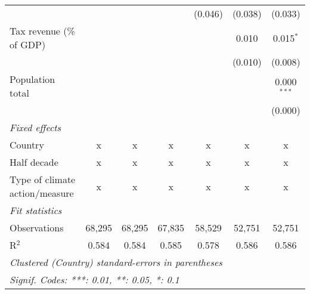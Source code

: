 \begin{tabular}{lcccccc}
                                                &         &                &                & (0.046)        & (0.038)        & (0.033)\\   
   Tax revenue (\% of GDP)                      &         &                &                &                & 0.010          & 0.015$^{*}$\\   
                                                &         &                &                &                & (0.010)        & (0.008)\\   
   Population total                             &         &                &                &                &                & 0.000$^{***}$\\   
                                                &         &                &                &                &                & (0.000)\\   
   \emph{Fixed effects}\\
   Country                                      & x       & x              & x              & x              & x              & x\\  
   Half decade                                  & x       & x              & x              & x              & x              & x\\  
   Type of climate action/measure               & x       & x              & x              & x              & x              & x\\  
   \midrule \emph{Fit statistics}\\
   Observations                                 & 68,295  & 68,295         & 67,835         & 58,529         & 52,751         & 52,751\\  
   R$^2$                                        & 0.584   & 0.584          & 0.585          & 0.578          & 0.586          & 0.586\\  
   \midrule
   \multicolumn{7}{l}{\emph{Clustered (Country) standard-errors in parentheses}}\\
   \multicolumn{7}{l}{\emph{Signif. Codes: ***: 0.01, **: 0.05, *: 0.1}}\\
\end{tabular}
\par\endgroup



